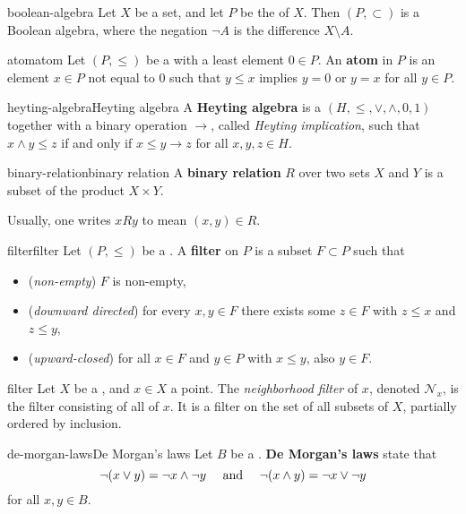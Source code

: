 \begin{example}{boolean-algebra}
    Let $X$ be a set, and let $P$ be the  of $X$. Then $(P, \subset)$ is a Boolean algebra, where the negation $\neg A$ is the difference $X \setminus A$.
\end{example}

\begin{topic}{atom}{atom}
    Let $(P, \le)$ be a  with a least element $0 \in P$. An \textbf{atom} in $P$ is an element $x \in P$ not equal to $0$ such that $y \le x$ implies $y = 0$ or $y = x$ for all $y \in P$.
\end{topic}

\begin{topic}{heyting-algebra}{Heyting algebra}
    A \textbf{Heyting algebra} is a  $(H, \le, \vee, \wedge, 0, 1)$ together with a binary operation $\rightarrow$, called \textit{Heyting implication}, such that $x \wedge y \le z$ if and only if $x \le y \rightarrow z$ for all $x, y, z \in H$.
\end{topic}

\begin{topic}{binary-relation}{binary relation}
    A \textbf{binary relation} $R$ over two sets $X$ and $Y$ is a subset of the product $X \times Y$.
    
    Usually, one writes $x R y$ to mean $(x, y) \in R$.
\end{topic}

\begin{topic}{filter}{filter}
    Let $(P, \le)$ be a . A \textbf{filter} on $P$ is a subset $F \subset P$ such that
    \begin{itemize}
        \item (\textit{non-empty}) $F$ is non-empty,
        \item (\textit{downward directed}) for every $x, y \in F$ there exists some $z \in F$ with $z \le x$ and $z \le y$,
        \item (\textit{upward-closed}) for all $x \in F$ and $y \in P$ with $x \le y$, also $y \in F$.
    \end{itemize}
\end{topic}

\begin{example}{filter}
    Let $X$ be a , and $x \in X$ a point. The \textit{neighborhood filter} of $x$, denoted $\mathcal{N}_x$, is the filter consisting of all  of $x$. It is a filter on the set of all subsets of $X$, partially ordered by inclusion.
\end{example}

\begin{topic}{de-morgan-laws}{De Morgan's laws}
    Let $B$ be a . \textbf{De Morgan's laws} state that
    \[ \neg (x \lor y) = \neg x \land \neg y \quad \textup{ and } \quad \neg (x \land y) = \neg x \lor \neg y \]
    for all $x, y \in B$.
\end{topic}
